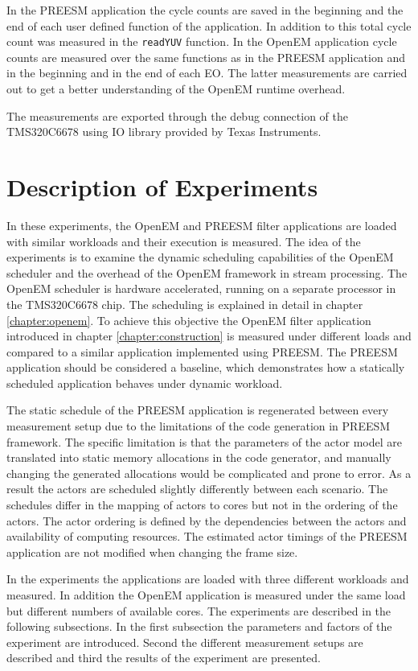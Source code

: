 In the PREESM application the cycle counts are saved in the beginning and the end of each user defined function of the application. In addition to this total cycle count was measured in the \texttt{readYUV} function. In the OpenEM application cycle counts are measured over the same functions as in the PREESM application and in the beginning and in the end of each EO. The latter measurements are carried out to get a better understanding of the OpenEM runtime overhead.

The measurements are exported through the debug connection of the TMS320C6678 using IO library provided by Texas Instruments.

\section{Description of Experiments}
\label{sec:experiment-description}
In these experiments, the OpenEM and PREESM filter applications are loaded with similar workloads and their execution is measured. The idea of the experiments is to examine the dynamic scheduling capabilities of the OpenEM scheduler and the overhead of the OpenEM framework in stream processing. The OpenEM scheduler is hardware accelerated, running on a separate processor in the TMS320C6678 chip. The scheduling is explained in detail in chapter \ref{chapter:openem}. To achieve this objective the OpenEM filter application introduced in chapter \ref{chapter:construction} is measured under different loads and compared to a similar application implemented using PREESM. The PREESM application should be considered a baseline, which demonstrates how a statically scheduled application behaves under dynamic workload.

The static schedule of the PREESM application is regenerated between every measurement setup due to the limitations of the code generation in PREESM framework. The specific limitation is that the parameters of the actor model are translated into static memory allocations in the code generator, and manually changing the generated allocations would be complicated and prone to error. As a result the actors are scheduled slightly differently between each scenario. The schedules differ in the mapping of actors to cores but not in the ordering of the actors. The actor ordering is defined by the dependencies between the actors and availability of computing resources. The estimated actor timings of the PREESM application are not modified when changing the frame size.

In the experiments the applications are loaded with three different workloads and measured. In addition the OpenEM application is measured under the same load but different numbers of available cores. The experiments are described in the following subsections. In the first subsection the parameters and factors of the experiment are introduced. Second the different measurement setups are described and third the results of the experiment are presented.

